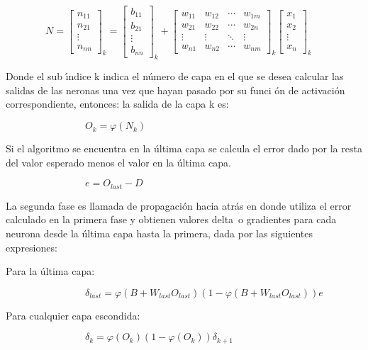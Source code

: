 \bigskip $\qquad \qquad N=\left[
\begin{array}{c}
n_{11} \\
n_{21} \\
\vdots \\
n_{nn}%
\end{array}%
\right] _{k}=\left[
\begin{array}{c}
b_{11} \\
b_{21} \\
\vdots \\
b_{nn}%
\end{array}%
\right] _{k}+\left[
\begin{array}{cccc}
w_{11} & w_{12} & \cdots & w_{1m} \\
w_{21} & w_{22} & \cdots & w_{2n} \\
\vdots & \vdots & \ddots & \vdots \\
w_{n1} & w_{n2} & \cdots & w_{nm}%
\end{array}%
\right] _{k}\left[
\begin{array}{c}
x_{1} \\
x_{2} \\
\vdots \\
x_{n}%
\end{array}%
\right] _{k}$

Donde el sub \'{\i}ndice k indica el n\'{u}mero de capa en el que se desea
calcular las salidas de las neronas una vez que hayan pasado por su funci%
\'{o}n de activaci\'{o}n correspondiente, entonces: la salida de la capa k
es:

$\qquad \qquad \qquad \qquad O_{k}=\varphi (N_{k})$

Si el algoritmo se encuentra en la \'{u}ltima capa se calcula el error dado
por la resta del valor esperado menos el valor en la \'{u}ltima capa.

$\qquad \qquad \qquad \qquad e=O_{last}-D$

La segunda fase es llamada de propagaci\'{o}n hacia atr\'{a}s en donde
utiliza el error calculado en la primera fase y obtienen valores delta\ o
gradientes para cada neurona desde la \'{u}ltima capa hasta la primera, dada
por las siguientes expresiones:

Para la \'{u}ltima capa:

$\qquad \qquad \qquad \qquad \delta _{last}=\varphi
(B+W_{last}O_{last})(1-\varphi (B+W_{last}O_{last}))e$

\bigskip Para cualquier capa escondida:

$\qquad \qquad \qquad \qquad \delta _{k}=\varphi (O_{k})(1-\varphi
(O_{k}))\delta _{k+1}$

